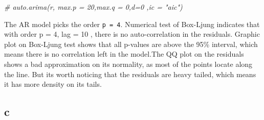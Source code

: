 \documentclass[
]{article}
\newenvironment{Shaded}{\begin{snugshade}}{\end{snugshade}}
\newcommand{\CommentTok}[1]{\textcolor[rgb]{0.56,0.35,0.01}{\textit{#1}}}
\begin{document}
\begin{Shaded}
\begin{Highlighting}[]
\CommentTok{\# auto.arima(r, max.p = 20,max.q = 0,d=0 ,ic = "aic")}
\end{Highlighting}
\end{Shaded}

The AR model picks the order \texttt{p\ =\ 4}. Numerical test of
Box-Ljung indicates that with order p = 4, lag = 10 , there is no
auto-correlation in the residuals. Graphic plot on Box-Ljung test shows
that all p-values are above the 95\% interval, which means there is no
correlation left in the model.The QQ plot on the residuals shows a bad
approximation on its normality, as most of the points locate along the
line. But its worth noticing that the residuals are heavy tailed, which
means it has more density on its tails.

\hypertarget{c-1}{%
\subsection{c}\label{c-1}}
\end{document}
